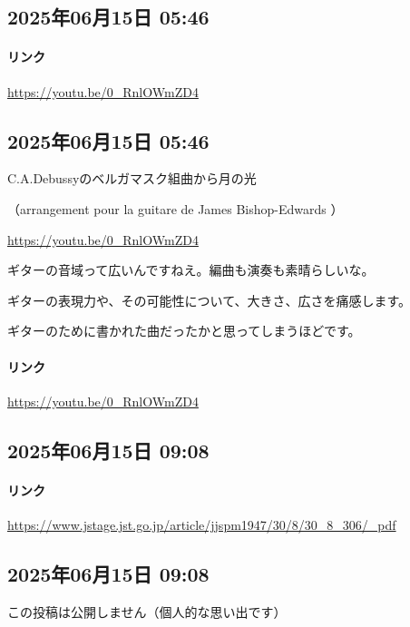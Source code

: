 \subsection*{2025年06月15日 05:46}

\paragraph{リンク}
\url{https://youtu.be/0_RnlOWmZD4}

\subsection*{2025年06月15日 05:46}

C.A.Debussyのベルガマスク組曲から月の光

（arrangement pour la guitare de James Bishop-Edwards ）

\url{https://youtu.be/0_RnlOWmZD4}

ギターの音域って広いんですねえ。編曲も演奏も素晴らしいな。

ギターの表現力や、その可能性について、大きさ、広さを痛感します。

ギターのために書かれた曲だったかと思ってしまうほどです。

\paragraph{リンク}
\url{https://youtu.be/0_RnlOWmZD4}

\subsection*{2025年06月15日 09:08}

\paragraph{リンク}
\url{https://www.jstage.jst.go.jp/article/jjspm1947/30/8/30_8_306/_pdf}

\subsection*{2025年06月15日 09:08}

この投稿は公開しません（個人的な思い出です）


